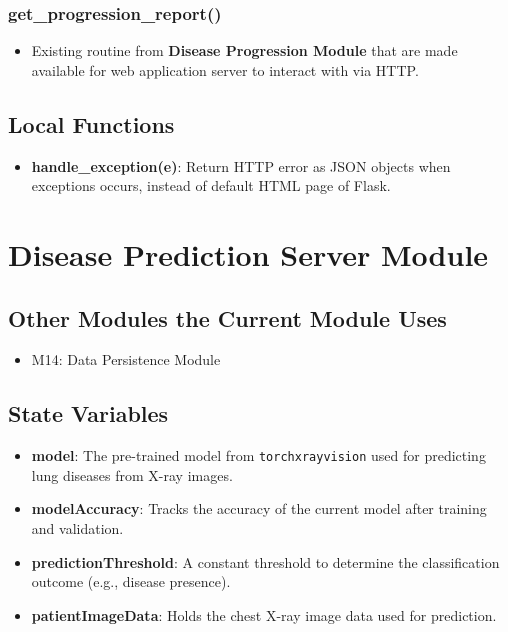 \documentclass[12pt, titlepage]{article}
\begin{document}
\subsubsection{get\_progression\_report()}
\begin{itemize}
    \item Existing routine from \textbf{Disease Progression Module} that are made available for web application server to interact with via HTTP.
\end{itemize}

\subsection{Local Functions}
\begin{itemize}
    \item \textbf{handle\_exception(e)}: Return HTTP error as JSON objects when exceptions occurs, instead of default HTML page of Flask.
\end{itemize}

\section{Disease Prediction Server Module}

\subsection{Other Modules the Current Module Uses}
\begin{itemize}
    \item M14: Data Persistence Module
\end{itemize}

\subsection{State Variables}
\begin{itemize}
    \item \textbf{model}: The pre-trained model from \texttt{torchxrayvision} used for predicting lung diseases from X-ray images.
    \item \textbf{modelAccuracy}: Tracks the accuracy of the current model after training and validation.
    \item \textbf{predictionThreshold}: A constant threshold to determine the classification outcome (e.g., disease presence).
    \item \textbf{patientImageData}: Holds the chest X-ray image data used for prediction.
\end{itemize}
\end{document}
